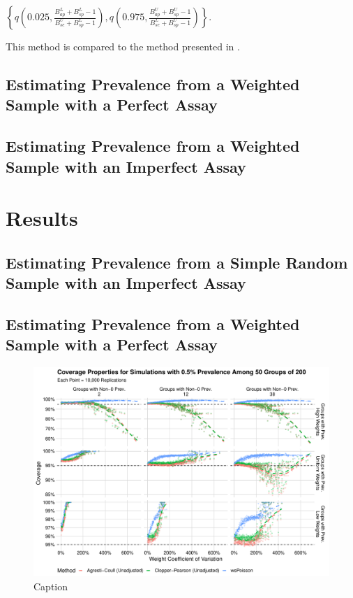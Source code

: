 \documentclass[AMA,STIX1COL]{WileyNJD-v2}
\begin{document}
\( \left\{ q \left( 0.025, \frac{B_{ap}^L + B_{sp}^L - 1}{B_{se}^U + B_{sp}^L - 1}  \right),  q \left( 0.975, \frac{B_{ap}^U + B_{sp}^U - 1}{B_{se}^L + B_{sp}^U - 1}  \right) \right\}.\)

This method is compared to the method presented in \citet{Lang:2014}.

\subsection{Estimating Prevalence from a Weighted Sample with a Perfect Assay}



\subsection{Estimating Prevalence from a Weighted Sample with an  Imperfect Assay}

\section{Results}
\subsection{Estimating Prevalence from a Simple Random Sample with an Imperfect Assay}
\subsection{Estimating Prevalence from a Weighted Sample with a Perfect Assay}

\begin{figure}
    \centering
    \includegraphics[width=\textwidth]{figures/perfect_coverage_50_0_005_reduced.pdf}
    \caption{Caption}
    \label{fig:perfect_coverage_50_0_005_reduced}
\end{figure}
\end{document}
